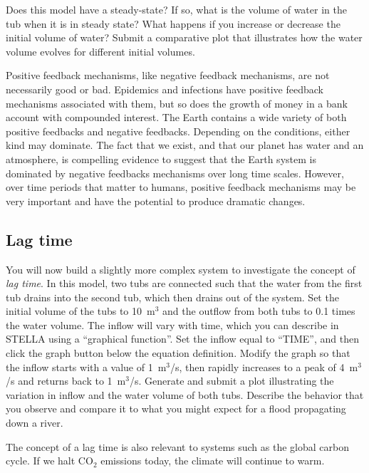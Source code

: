\documentclass[11pt,letterpaper]{article}
\begin{document}
Does this model have a steady-state? If so, what is the volume of water in the tub when it is in steady state? What happens if you increase or decrease the initial volume of water? Submit a comparative plot that illustrates how the water volume evolves for different initial volumes.

Positive feedback mechanisms, like negative feedback mechanisms, are not necessarily good or bad. Epidemics and infections have positive feedback mechanisms associated with them, but so does the growth of money in a bank account with compounded interest. The Earth contains a wide variety of both positive feedbacks and negative feedbacks. Depending on the conditions, either kind may dominate. The fact that we exist, and that our planet has water and an atmosphere, is compelling evidence to suggest that the Earth system is dominated by negative feedbacks mechanisms over long time scales. However, over time periods that matter to humans, positive feedback mechanisms may be very important and have the potential to produce dramatic changes.

\subsection{Lag time}
You will now build a slightly more complex system to investigate the concept of \textit{lag time}. In this model, two tubs are connected such that the water from the first tub drains into the second tub, which then drains out of the system. Set the initial volume of the tubs to 10~m$^3$ and the outflow from both tubs to 0.1 times the water volume. The inflow will vary with time, which you can describe in STELLA using a ``graphical function''. Set the inflow equal to ``TIME'', and then click the graph button below the equation definition. Modify the graph so that the inflow starts with a value of 1~m$^3$/s, then rapidly increases to a peak of 4~m$^3$/s and returns back to 1~m$^3$/s. Generate and submit a plot illustrating the variation in inflow and the water volume of both tubs. Describe the behavior that you observe and compare it to what you might expect for a flood propagating down a river.

The concept of a lag time is also relevant to systems such as the global carbon cycle. If we halt CO$_2$ emissions today, the climate will continue to warm.
\end{document}
